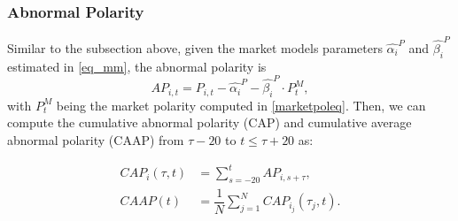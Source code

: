 \subsubsection{Abnormal Polarity}
Similar to the subsection above, given the market models parameters $\hat{\alpha_i}^P$ and $\hat{\beta_i}^P$ estimated in \eqref{eq_mm}, the abnormal polarity is
\[    AP_{i,t} = P_{i,t} - \hat{\alpha_i}^P - \hat{\beta_i}^P \cdot P_t^M,\]
with $P_t^M$ being the market polarity computed in \eqref{marketpoleq}. Then, we can compute the cumulative abnormal polarity (CAP) and cumulative average abnormal polarity (CAAP) from $\tau - 20$ to $t \le \tau + 20$ as:

\begin{align*}
    CAP_i(\tau,t) &= \sum_{s=- 20}^{t} AP_{i,s+\tau}, \\
    CAAP(t) &= \dfrac{1}{N} \sum_{j=1}^N CAP_{i_j}(\tau_j,t).
\end{align*}

